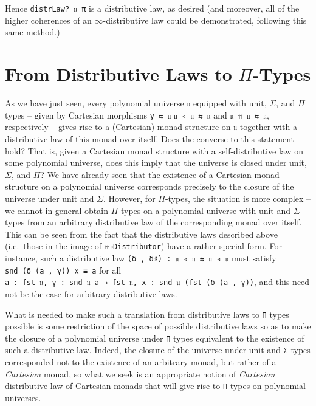 \documentclass[
  11pt,
  oneside,
  article]{memoir}
\theoremstyle{definition}
\theoremstyle{plain}
\newcommand{\0}{\textsf{0}}
\newcommand{\1}{\tn{\textsf{1}}}
\begin{document}
Hence \texttt{distrLaw?\ 𝔲\ π} is a distributive law, as desired (and
moreover, all of the higher coherences of an \(\infty\)-distributive law
could be demonstrated, following this same method.)

\section{\texorpdfstring{From Distributive Laws to
\(\Pi\)-Types}{From Distributive Laws to \textbackslash Pi-Types}}\label{from-distributive-laws-to-pi-types}

As we have just seen, every polynomial universe \texttt{𝔲} equipped with
unit, \(\Sigma\), and \(\Pi\) types -- given by Cartesian morphisms
\texttt{y\ ⇆\ 𝔲} \texttt{𝔲\ ◃\ 𝔲\ ⇆\ 𝔲} and \texttt{𝔲\ ⇈\ 𝔲\ ⇆\ 𝔲},
respectively -- gives rise to a (Cartesian) monad structure on
\texttt{𝔲} together with a distributive law of this monad over itself.
Does the converse to this statement hold? That is, given a Cartesian
monad structure with a self-distributive law on some polynomial
universe, does this imply that the universe is closed under unit,
\(\Sigma\), and \(\Pi\)? We have already seen that the existence of a
Cartesian monad structure on a polynomial universe corresponds precisely
to the closure of the universe under unit and \(\Sigma\). However, for
\(\Pi\)-types, the situation is more complex -- we cannot in general
obtain \(\Pi\) types on a polynomial universe with unit and \(\Sigma\)
types from an arbitrary distributive law of the corresponding monad over
itself. This can be seen from the fact that the distributive laws
described above (i.e.~those in the image of \texttt{⇈→Distributor}) have
a rather special form. For instance, such a distributive law
\texttt{(δ\ ,\ δ♯)\ :\ 𝔲\ ◃\ 𝔲\ ⇆\ 𝔲\ ◃\ 𝔲} must satisfy
\texttt{snd\ (δ\ (a\ ,\ γ))\ x\ ≡\ a} for all
\texttt{a\ :\ fst\ 𝔲,\ γ\ :\ snd\ 𝔲\ a\ →\ fst\ 𝔲,\ x\ :\ snd\ 𝔲\ (fst\ (δ\ (a\ ,\ γ))},
and this need not be the case for arbitrary distributive laws.

What is needed to make such a translation from distributive laws to
\texttt{Π} types possible is some restriction of the space of possible
distributive laws so as to make the closure of a polynomial universe
under \texttt{Π} types equivalent to the existence of such a
distributive law. Indeed, the closure of the universe under unit and
\texttt{Σ} types corresponded not to the existence of an arbitrary
monad, but rather of a \emph{Cartesian} monad, so what we seek is an
appropriate notion of \emph{Cartesian} distributive law of Cartesian
monads that will give rise to \texttt{Π} types on polynomial universes.
\end{document}
